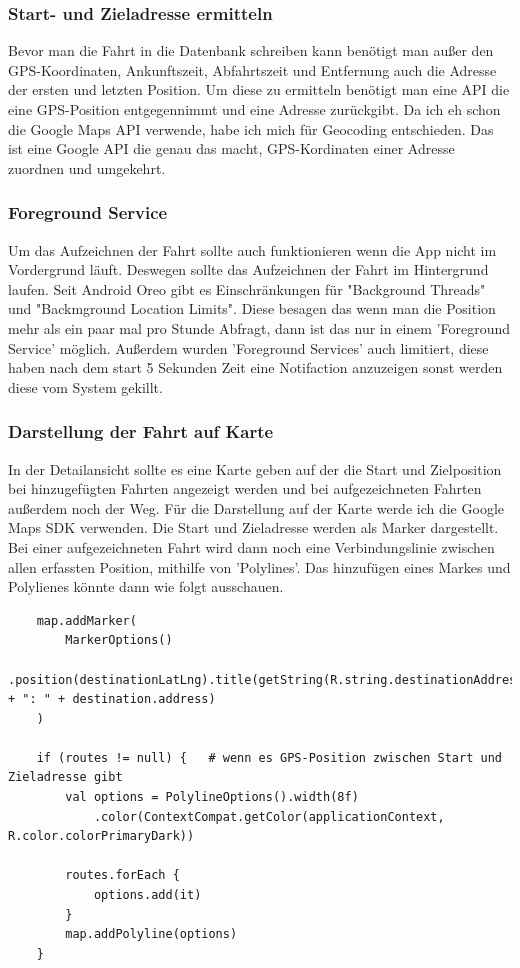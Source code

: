 \documentclass[a4paper]{article}
\begin{document}
\subsubsection{Start- und Zieladresse ermitteln}
Bevor man die Fahrt in die Datenbank schreiben kann benötigt man außer den GPS-Koordinaten, Ankunftszeit, Abfahrtszeit und 
Entfernung auch die Adresse der ersten und letzten Position. Um diese zu ermitteln benötigt man eine API die eine GPS-Position 
entgegennimmt und eine Adresse zurückgibt. Da ich eh schon die Google Maps API verwende, habe ich mich für Geocoding entschieden.
Das ist eine Google API die genau das macht, GPS-Kordinaten einer Adresse zuordnen und umgekehrt. 

\subsubsection{Foreground Service}
Um das Aufzeichnen der Fahrt sollte auch funktionieren wenn die App nicht im Vordergrund läuft.
Deswegen sollte das Aufzeichnen der Fahrt im Hintergrund laufen.
Seit Android Oreo gibt es Einschränkungen für "Background Threads" und "Backmground Location Limits". 
Diese besagen das wenn man die Position mehr als ein paar mal pro Stunde Abfragt, dann ist das nur in einem
'Foreground Service' möglich. Außerdem wurden 'Foreground Services' auch limitiert, diese haben nach dem start 5 Sekunden
Zeit eine Notifaction anzuzeigen sonst werden diese vom System gekillt.

\subsubsection{Darstellung der Fahrt auf Karte}
In der Detailansicht sollte es eine Karte geben auf der die Start und Zielposition bei hinzugefügten Fahrten angezeigt werden
und bei aufgezeichneten Fahrten außerdem noch der Weg. Für die Darstellung auf der Karte werde ich die Google Maps SDK verwenden.
Die Start und Zieladresse werden als Marker dargestellt. Bei einer aufgezeichneten Fahrt wird dann noch eine Verbindungslinie 
zwischen allen erfassten Position, mithilfe von 'Polylines'. 
Das hinzufügen eines Markes und Polylienes könnte dann wie folgt ausschauen.

\begin{verbatim}
	map.addMarker(
		MarkerOptions()
			.position(destinationLatLng).title(getString(R.string.destinationAddress) + ": " + destination.address)
	)

	if (routes != null) {	# wenn es GPS-Position zwischen Start und Zieladresse gibt
		val options = PolylineOptions().width(8f)
			.color(ContextCompat.getColor(applicationContext, R.color.colorPrimaryDark))

		routes.forEach {
			options.add(it) 
		}
		map.addPolyline(options)
	}
\end{verbatim}
\end{document}
